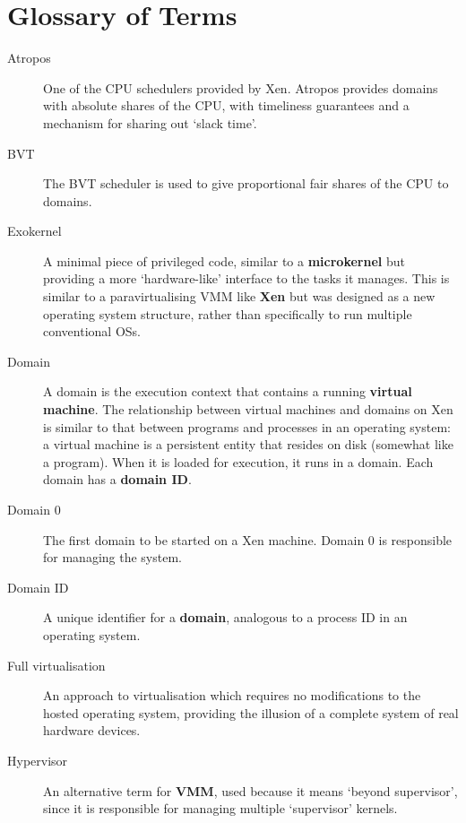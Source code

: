 \chapter{Glossary of Terms}

\begin{description}

\item[Atropos] One of the CPU schedulers provided by Xen.  Atropos
  provides domains with absolute shares of the CPU, with timeliness
  guarantees and a mechanism for sharing out `slack time'.

\item[BVT] The BVT scheduler is used to give proportional fair shares
  of the CPU to domains.

\item[Exokernel] A minimal piece of privileged code, similar to a {\bf
    microkernel} but providing a more `hardware-like' interface to the
  tasks it manages.  This is similar to a paravirtualising VMM like
  {\bf Xen} but was designed as a new operating system structure,
  rather than specifically to run multiple conventional OSs.

\item[Domain] A domain is the execution context that contains a
  running {\bf virtual machine}.  The relationship between virtual
  machines and domains on Xen is similar to that between programs and
  processes in an operating system: a virtual machine is a persistent
  entity that resides on disk (somewhat like a program).  When it is
  loaded for execution, it runs in a domain.  Each domain has a {\bf
    domain ID}.

\item[Domain 0] The first domain to be started on a Xen machine.
  Domain 0 is responsible for managing the system.

\item[Domain ID] A unique identifier for a {\bf domain}, analogous to
  a process ID in an operating system.

\item[Full virtualisation] An approach to virtualisation which
  requires no modifications to the hosted operating system, providing
  the illusion of a complete system of real hardware devices.

\item[Hypervisor] An alternative term for {\bf VMM}, used because it
  means `beyond supervisor', since it is responsible for managing
  multiple `supervisor' kernels.


\end{description}
